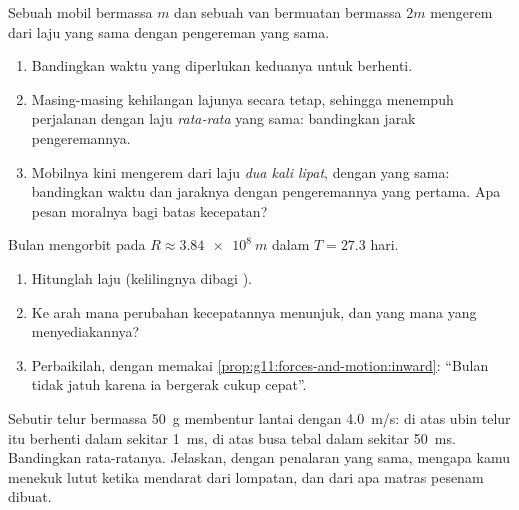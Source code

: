 \begin{exercise}[$\star\star\star$]\label{exo:g11:forces-and-motion:13}
Sebuah mobil bermassa $m$ dan sebuah van bermuatan bermassa $2m$
mengerem dari laju yang sama dengan  pengereman yang sama.
\begin{enumerate}
  \item Bandingkan waktu yang diperlukan keduanya untuk berhenti.
  \item Masing-masing kehilangan lajunya secara tetap, sehingga
        menempuh perjalanan dengan laju \emph{rata-rata} yang sama:
        bandingkan jarak pengeremannya.
  \item Mobilnya kini mengerem dari laju \emph{dua kali lipat}, dengan
         yang sama: bandingkan waktu dan jaraknya dengan
        pengeremannya yang pertama. Apa pesan moralnya bagi batas
        kecepatan?
\end{enumerate}
\end{exercise}

\begin{exercise}[$\star\star\star$]\label{exo:g11:forces-and-motion:14}
Bulan mengorbit pada $R \approx \qty{3.84e8}{m}$ dalam
$T = \num{27.3}$ hari.
\begin{enumerate}
  \item Hitunglah laju  (kelilingnya dibagi ).
  \item Ke arah mana perubahan kecepatannya menunjuk, dan  yang
        mana yang menyediakannya?
  \item Perbaikilah, dengan memakai
        \cref{prop:g11:forces-and-motion:inward}: ``Bulan tidak jatuh
        karena ia bergerak cukup cepat''.
\end{enumerate}
\end{exercise}

\begin{exercise}[$\star\star\star$]\label{exo:g11:forces-and-motion:15}
Sebutir telur bermassa \qty{50}{g} membentur lantai dengan
\qty{4.0}{m/s}: di atas ubin telur itu berhenti dalam sekitar
\qty{1}{ms}, di atas busa tebal dalam sekitar \qty{50}{ms}. Bandingkan
 rata-ratanya. Jelaskan, dengan penalaran yang sama, mengapa kamu
menekuk lutut ketika mendarat dari lompatan, dan dari apa matras
pesenam dibuat.
\end{exercise}

